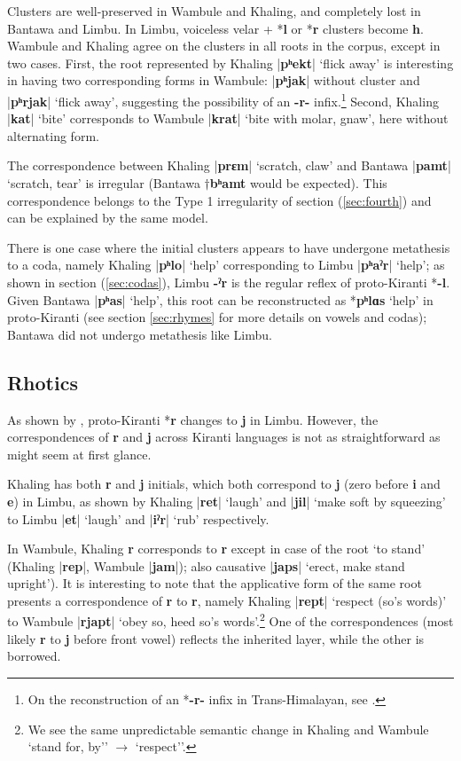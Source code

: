 \documentclass[oneside,a4paper,11pt]{article}
\newcommand{\ipa}[1]{\textbf{{\phon\mbox{#1}}}} %
\newcommand{\dhatu}[2]{|\ipa{#1}| `#2'}
\begin{document}
Clusters are well-preserved in Wambule and Khaling, and completely lost in Bantawa and Limbu. In Limbu, voiceless velar + *\ipa{l} or *\ipa{r} clusters become \ipa{h}. Wambule and Khaling  agree on the clusters in all roots in the corpus, except in two cases. First, the root represented by Khaling \dhatu{pʰekt}{flick away} is interesting in having two corresponding forms in Wambule: |\ipa{pʰjak}| without cluster and \dhatu{pʰrjak}{flick away}, suggesting the possibility of an \ipa{-r-} infix.\footnote{On the reconstruction of an *\ipa{-r-} infix in Trans-Himalayan, see \citet[111-120]{sagart99roc}.} Second, Khaling \dhatu{kat}{bite} corresponds to Wambule  \dhatu{krat}{bite with molar, gnaw}, here without alternating form.

The correspondence between Khaling \dhatu{prɛm}{scratch, claw} and Bantawa  \dhatu{pamt}{scratch, tear} is irregular (Bantawa $\dagger$\ipa{bʰamt} would be expected). This correspondence belongs to the Type 1 irregularity of section (\ref{sec:fourth}) and can be explained by the same model.

There is one case where the initial clusters appears to have undergone metathesis to a coda, namely Khaling \dhatu{pʰlo}{help} corresponding to Limbu \dhatu{pʰaˀr}{help}; as shown in section (\ref{sec:codas}), Limbu \ipa{-ˀr} is the regular reflex of proto-Kiranti *\ipa{-l}. Given Bantawa \dhatu{pʰas}{help}, this root can be reconstructed as *\ipa{pʰlɑs} `help' in proto-Kiranti (see section \ref{sec:rhymes} for more details on vowels and codas); Bantawa did not undergo metathesis like Limbu.
 
\subsection{Rhotics} 
As shown by  \citet{driem90r}, proto-Kiranti *\ipa{r} changes to \ipa{j} in Limbu. However, the correspondences of \ipa{r} and \ipa{j} across Kiranti languages is not as straightforward as might seem at first glance.

Khaling has both \ipa{r} and \ipa{j} initials, which both correspond to \ipa{j} (zero before \ipa{i} and \ipa{e}) in Limbu, as shown by Khaling \dhatu{ret}{laugh} and  \dhatu{jil}{make soft by squeezing} to Limbu \dhatu{et}{laugh} and \dhatu{iˀr}{rub} respectively.

In Wambule, Khaling \ipa{r} corresponds to \ipa{r} except in case of the root `to stand' (Khaling |\ipa{rep}|, Wambule  |\ipa{jam}|); also causative \dhatu{japs}{erect, make stand upright}). It is interesting to note that the applicative form of the same root presents a correspondence of \ipa{r} to \ipa{r}, namely Khaling \dhatu{rept}{respect (so's words)} to Wambule \dhatu{rjapt}{obey so, heed so's words}.\footnote{We see the same unpredictable semantic change in Khaling and Wambule `stand for, by'' $\rightarrow$ `respect''.} One of the correspondences (most likely \ipa{r} to \ipa{j} before front vowel) reflects the inherited layer, while the other is borrowed.  
\end{document}
